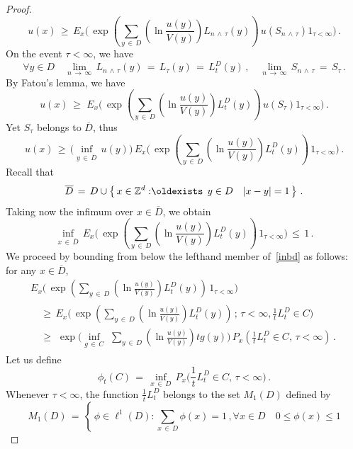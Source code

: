 \documentclass[AHL, Unicode, longabstracts, published]{cedram}
\newcommand*\bD{\overline{D}}
\newcommand*\Zd {{\mathbb Z^d}}
\renewcommand*{\exists}{\mathrel{\oldexists}}
\let\oldforall\forall
\renewcommand*{\forall}{\mathrel{\oldforall}}
\begin{document}
\begin{proof}
\[
u(x)\,\geq\,
E_x\Bigg(
\,\exp\left(\sum_{y\,\in\,D}\left(\ln
\frac{u(y)}{V(y)}\right)L_{n\,\wedge\,\tau}(y)\right)\, u(S_{n\,\wedge\,\tau}) 1_{\tau<\infty}
\Bigg)
\,.
\]
On the event $\tau<\infty$, we have
\[
\forall y\in D\quad
\lim_{n\,\to\,\infty}\, L_{n\,\wedge\,\tau}(y)\,=\, L_{\tau}(y)\,=\, L_t^D(y)\,,
\quad\lim_{n\,\to\,\infty}\, S_{n\,\wedge\,\tau}\,=\, S_{\tau}
\,.
\]
By Fatou's lemma, we have
\begin{equation*}
u(x)
\,\geq\,
\,E_x\Bigg(
\,\exp\left(\sum_{y\,\in\,D}\left(\ln
\frac{u(y)}{V(y)}\right)L_{t}^D(y)\right)\, u(S_\tau) 1_{\tau<\infty}
\Bigg)\,.
\end{equation*}
Yet $S_\tau$ belongs to $\bD$, thus
\begin{equation}
u(x)
\,\geq\,
\Big(\inf_{y\,\in\,\bD}\,u(y)\Big)
\,E_x\Bigg(
\,\exp\left(\sum_{y\,\in\,D}\left(\ln
\frac{u(y)}{V(y)}\right)L_{t}^D(y)\right)\, 1_{\tau<\infty}
\Bigg)\,.
\end{equation}
Recall that
\[
\bD\,=\,D\cup\left\{\,x\in\Zd:\exists\, y\in D\quad |x-y|=1\,\right\}\,.
\]
Taking now the infimum over $x\in \bD$, we obtain
\begin{equation}\label{inbd}
\inf_{x\,\in\,\bD}
\,E_x\Bigg(
\,\exp\left(\sum_{y\,\in\,D}\left(\ln
\frac{u(y)}{V(y)}\right)L_{t}^D(y)\right)\, 1_{\tau<\infty}
\Bigg)\,\leq\,1\,.
\end{equation}
We proceed by bounding from below the lefthand member of~\eqref{inbd} as follows: for any $x\in \bD$,
\begin{multline}\label{foui}
\,E_x\Bigg(
\,\exp\left(\sum_{y\,\in\,D}\left(\ln
\frac{u(y)}{V(y)}\right)L_{t}^D(y)\right)\, 1_{\tau<\infty}
\Bigg)\,\\
\begin{aligned}
&\geq\,E_x\Bigg(
\,\exp\left(\sum_{y\,\in\,D}\left(\ln
\frac{u(y)}{V(y)}\right)L_{t}^D(y)\right)\,;
\,\tau<\infty,\frac{1}{t}L_t^D\in C
\Bigg)\\
&\geq\,
\,\exp\Bigg(
\inf_{g\,\in\,C}\,\,\sum_{y\,\in\,D}\left(\ln
\frac{u(y)}{V(y)}\right){t}g(y)\Bigg)\, P_x\left(\frac{1}{t}L_t^D\in C,\,\tau<\infty\right)\,.
\end{aligned}
\end{multline}
Let us define
\begin{equation}\label{phitc}
\phi_t(C)\,=\,
\inf_{x\,\in\,D}\, P_x\bigg(\frac{1}{t}L_t^D\in C,\,\tau<\infty\bigg)\,.
\end{equation}
Whenever $\tau<\infty$, the function $\frac{1}{t}L_t^D$ belongs to the set $M_1(D)$ defined by
\[
M_1(D)\,=\,\left\{\,\phi
\in\ell^1(D):\sum_{x\,\in\,D}\phi(x)=1\,,\forall x\in D\quad 0\leq\phi(x)\leq 1
\]
\end{proof}
\end{document}
